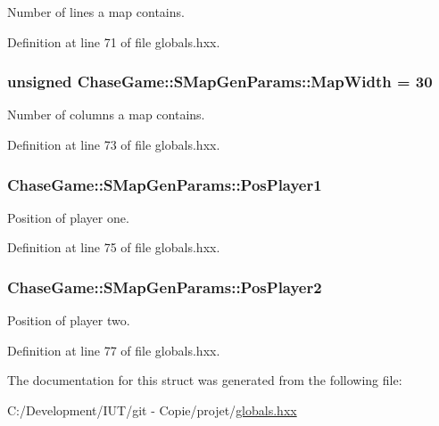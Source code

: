 Number of lines a map contains. 



Definition at line 71 of file globals.\-hxx.

\hypertarget{struct_chase_game_1_1_s_map_gen_params_a0897aeaa1a1a3a66697a6b441ca8c2de}{
\subsubsection[{Map\-Width}]{\setlength{\rightskip}{0pt plus 5cm}unsigned Chase\-Game\-::\-S\-Map\-Gen\-Params\-::\-Map\-Width = 30}}\label{struct_chase_game_1_1_s_map_gen_params_a0897aeaa1a1a3a66697a6b441ca8c2de}


Number of columns a map contains. 



Definition at line 73 of file globals.\-hxx.

\hypertarget{struct_chase_game_1_1_s_map_gen_params_a8db28a9ee45a200d67b20fc803645501}{
\subsubsection[{Pos\-Player1}]{ Chase\-Game\-::\-S\-Map\-Gen\-Params\-::\-Pos\-Player1}}\label{struct_chase_game_1_1_s_map_gen_params_a8db28a9ee45a200d67b20fc803645501}


Position of player one. 



Definition at line 75 of file globals.\-hxx.

\hypertarget{struct_chase_game_1_1_s_map_gen_params_afd0a0d4b22e228d547af88d38b6ae963}{
\subsubsection[{Pos\-Player2}]{ Chase\-Game\-::\-S\-Map\-Gen\-Params\-::\-Pos\-Player2}}\label{struct_chase_game_1_1_s_map_gen_params_afd0a0d4b22e228d547af88d38b6ae963}


Position of player two. 



Definition at line 77 of file globals.\-hxx.



The documentation for this struct was generated from the following file\-:\begin{DoxyCompactItemize}
\item 
C\-:/\-Development/\-I\-U\-T/git -\/ Copie/projet/\hyperlink{globals_8hxx}{globals.\-hxx}\end{DoxyCompactItemize}
